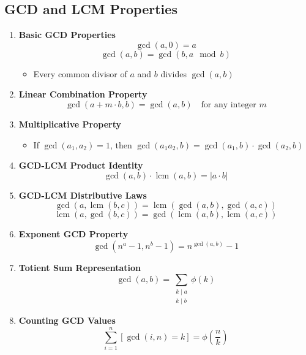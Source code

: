 \documentclass[twoside]{article}
\begin{document}
\begin{multicols*}{2}
{
\subsection*{GCD and LCM Properties}
}
\begin{enumerate}[leftmargin=*]
    \item \textbf{Basic GCD Properties}
        \[\gcd(a, 0) = a\]
        \[\gcd(a, b) = \gcd(b, a \mod b)\]
        \begin{itemize}
            \item Every common divisor of $a$ and $b$ divides $\gcd(a,b)$
        \end{itemize}
    
    \item \textbf{Linear Combination Property}
        \[\gcd(a + m \cdot b, b) = \gcd(a, b) \quad \text{for any integer } m\]
    
    \item \textbf{Multiplicative Property}
        \begin{itemize}
            \item If $\gcd(a_1, a_2) = 1$, then $\gcd(a_1 a_2, b) = \gcd(a_1, b) \cdot \gcd(a_2, b)$
        \end{itemize}
    
    \item \textbf{GCD-LCM Product Identity}
        \[\gcd(a, b) \cdot \operatorname{lcm}(a, b) = |a \cdot b|\]
    
    \item \textbf{GCD-LCM Distributive Laws}
        \[\gcd(a, \operatorname{lcm}(b, c)) = \operatorname{lcm}(\gcd(a, b), \gcd(a, c))\]
        \[\operatorname{lcm}(a, \gcd(b, c)) = \gcd(\operatorname{lcm}(a, b), \operatorname{lcm}(a, c))\]
    
    \item \textbf{Exponent GCD Property}
        \[\gcd(n^a - 1, n^b - 1) = n^{\gcd(a,b)} - 1\]
    
    \item \textbf{Totient Sum Representation}
        \[\gcd(a, b) = \sum_{\substack{k \mid a \\ k \mid b}} \phi(k)\]
    
    \item \textbf{Counting GCD Values}
        \[\sum_{i=1}^n [\gcd(i, n) = k] = \phi\left(\frac{n}{k}\right)\]
    

\end{enumerate}
\end{multicols*}
\end{document}
